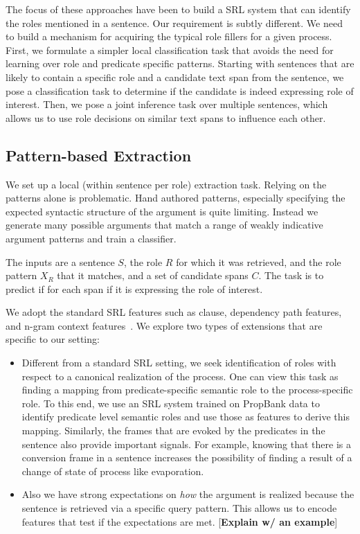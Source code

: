 The focus of these approaches have been to build a SRL system that can identify the roles mentioned in a sentence. 
Our requirement is subtly different. We need to build a mechanism for acquiring the typical role fillers for a given process. 
First, we formulate a simpler local classification task that avoids the need for learning over role and predicate specific patterns. 
Starting with sentences that are likely to contain a specific role and a candidate text span from the sentence, 
we pose a classification task to determine if the candidate  is indeed expressing role of interest. 
Then, we pose a joint inference task over multiple sentences, which allows us to use role decisions on similar 
text spans to influence each other. 

\subsection{Pattern-based Extraction}

We set up a local (within sentence per role) extraction task. Relying on the patterns alone is problematic. Hand authored patterns, especially specifying the expected syntactic structure of the argument is quite limiting. Instead we generate many possible arguments that match a range of weakly indicative argument patterns and train a classifier. 

The inputs are a sentence $S$, the role $R$ for which it was retrieved, and the role pattern $X_R$ that it matches, and a set of candidate spans $C$.
The task is to predict if for each span if it is expressing the role of interest. 

We adopt the standard SRL features such as clause, dependency path features, and n-gram context features~\cite{gildea2002automatic,koomen2005generalized}. 
We explore two types of extensions that are specific to our setting:
\begin{itemize}

\item Different from a standard SRL setting, we seek identification of roles with respect to a canonical realization of the process. 
One can view this task as finding a mapping from predicate-specific semantic role to the process-specific role. 
To this end, we use an SRL system trained on PropBank data to identify predicate level semantic roles and use those as features to derive this mapping.
Similarly, the frames that are evoked by the predicates in the sentence also provide important signals. For example, knowing that there is a conversion 
frame in a sentence increases the possibility of finding a result of a change of state of process like evaporation. 

\item Also we have strong expectations on {\em how} the argument is realized because the sentence is retrieved via a specific query pattern.
This allows us to encode features that test if the expectations are met. [{\bf Explain w/ an example}]

\end{itemize}


